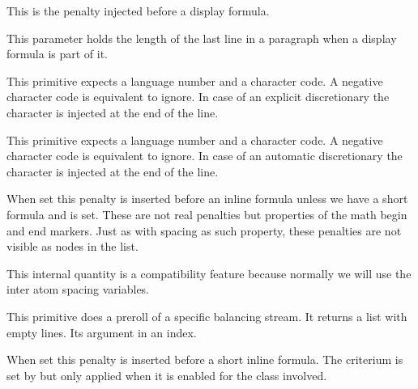 \startoldprimitive[title={\prm {predisplaypenalty}}]

This is the penalty injected before a display formula.

\stopoldprimitive

\startoldprimitive[title={\prm {predisplaysize}}]

This parameter holds the length of the last line in a paragraph when a display
formula is part of it.

\stopoldprimitive

\startnewprimitive[title={\prm {preexhyphenchar}}]

This primitive expects a language number and a character code. A negative
character code is equivalent to ignore. In case of an explicit discretionary the
character is injected at the end of the line.

\stopnewprimitive

\startnewprimitive[title={\prm {prehyphenchar}}]

This primitive expects a language number and a character code. A negative
character code is equivalent to ignore. In case of an automatic discretionary the
character is injected at the end of the line.

\stopnewprimitive

\startnewprimitive[title={\prm {preinlinepenalty}}]

When set this penalty is inserted before an inline formula unless we have a short
formula and  is set. These are not real penalties but
properties of the math begin and end markers. Just as with spacing as such
property, these penalties are not visible as nodes in the list.

\stopnewprimitive

\startnewprimitive[title={\prm {prerelpenalty}}]

This internal quantity is a compatibility feature because normally we will use
the inter atom spacing variables.

\stopnewprimitive

\startnewprimitive[title={\prm {prerollmvl}}]

This primitive does a preroll of a specific balancing stream. It returns a list
with empty lines. Its argument in an index.

\stopnewprimitive

\startnewprimitive[title={\prm {preshortinlinepenalty}}]

When set this penalty is inserted before a short inline formula. The criterium is
set by  but only applied when it is enabled for
the class involved.

